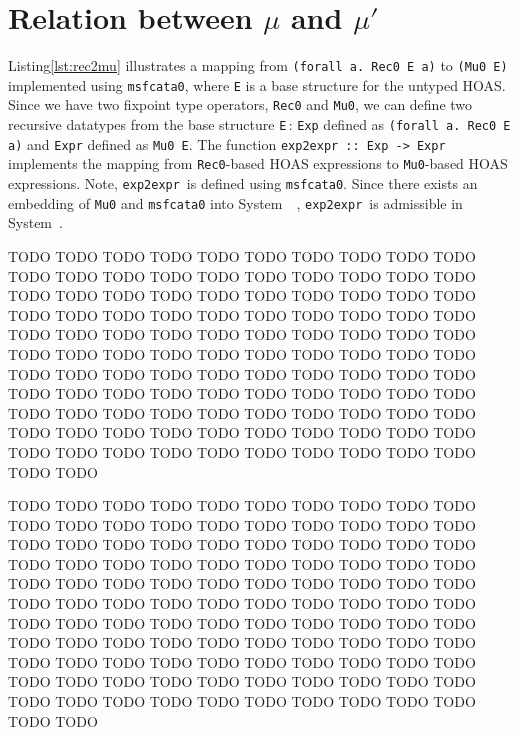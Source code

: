 \section{Relation between $\mu$ and $\mu'$}\label{sec:murec}
Listing\;\ref{lst:rec2mu} illustrates a mapping from
\lstinline{(forall a. Rec0 E a)}  to \lstinline{(Mu0 E)} implemented
using \lstinline{msfcata0}, where \lstinline{E} is a base structure
for the untyped HOAS. Since we have two fixpoint type operators,
\lstinline{Rec0} and \lstinline{Mu0}, we can define two recursive datatypes
from the base structure \lstinline{E}\,:
\lstinline{Exp} defined as \lstinline{(forall a. Rec0 E a)} and
\lstinline{Expr} defined as \lstinline{Mu0 E}.
The function \lstinline{exp2expr :: Exp -> Expr}\, implements the mapping from
\lstinline{Rec0}-based HOAS expressions to \lstinline{Mu0}-based
HOAS expressions. Note, \lstinline{exp2expr}\, is defined
using \lstinline{msfcata0}.  Since there exists an embedding of
\lstinline{Mu0} and \lstinline{msfcata0} into System~\Fw\ \cite{AhnShe11},
\lstinline{exp2expr}\, is admissible in System~\Fw.



TODO TODO TODO TODO TODO TODO TODO TODO TODO TODO TODO TODO TODO TODO
TODO TODO TODO TODO TODO TODO TODO TODO TODO TODO TODO TODO TODO TODO
TODO TODO TODO TODO TODO TODO TODO TODO TODO TODO TODO TODO TODO TODO
TODO TODO TODO TODO TODO TODO TODO TODO TODO TODO TODO TODO TODO TODO
TODO TODO TODO TODO TODO TODO TODO TODO TODO TODO TODO TODO TODO TODO
TODO TODO TODO TODO TODO TODO TODO TODO TODO TODO TODO TODO TODO TODO
TODO TODO TODO TODO TODO TODO TODO TODO TODO TODO TODO TODO TODO TODO
TODO TODO TODO TODO TODO TODO TODO TODO TODO TODO TODO TODO TODO TODO


\begin{figure}

\vspace*{-3ex}
\end{figure}

TODO TODO TODO TODO TODO TODO TODO TODO TODO TODO TODO TODO TODO TODO
TODO TODO TODO TODO TODO TODO TODO TODO TODO TODO TODO TODO TODO TODO
TODO TODO TODO TODO TODO TODO TODO TODO TODO TODO TODO TODO TODO TODO
TODO TODO TODO TODO TODO TODO TODO TODO TODO TODO TODO TODO TODO TODO
TODO TODO TODO TODO TODO TODO TODO TODO TODO TODO TODO TODO TODO TODO
TODO TODO TODO TODO TODO TODO TODO TODO TODO TODO TODO TODO TODO TODO
TODO TODO TODO TODO TODO TODO TODO TODO TODO TODO TODO TODO TODO TODO
TODO TODO TODO TODO TODO TODO TODO TODO TODO TODO TODO TODO TODO TODO


